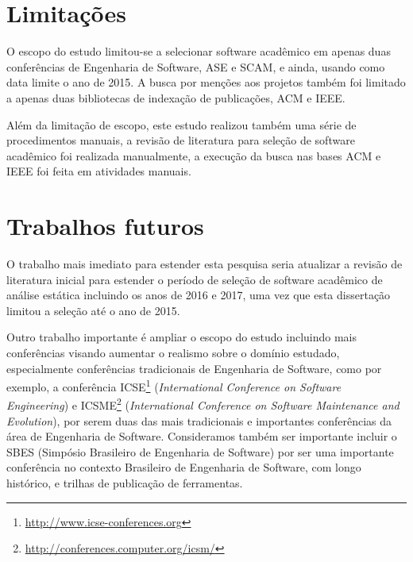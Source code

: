 
\section{Limitações}


O escopo do estudo limitou-se a selecionar software acadêmico em apenas
duas conferências de
Engenharia de Software, ASE e SCAM, e ainda, usando como data limite o ano de
2015. A busca por menções aos projetos também foi limitado a apenas duas
bibliotecas de indexação de publicações, ACM e IEEE.


Além da limitação de escopo, este estudo realizou também uma série de
procedimentos manuais, a revisão de literatura para seleção de software
acadêmico foi realizada manualmente, a execução da busca nas bases ACM e IEEE
foi feita em atividades manuais.


\section{Trabalhos futuros}


O trabalho mais imediato para estender esta pesquisa seria atualizar a revisão
de literatura inicial para estender o período de seleção de software acadêmico
de análise estática incluindo os anos de 2016 e 2017, uma vez que esta
dissertação limitou a seleção até o ano de 2015.

Outro trabalho importante é ampliar o escopo do estudo incluindo mais
conferências visando aumentar o realismo sobre o domínio estudado,
especialmente conferências tradicionais de Engenharia de Software, como por
exemplo, a conferência ICSE\footnote{\url{http://www.icse-conferences.org}}
({\it International Conference on Software Engineering}) e
ICSME\footnote{\url{http://conferences.computer.org/icsm/}} ({\it International
Conference on Software Maintenance and Evolution}), por serem duas das mais
tradicionais e importantes conferências da área de Engenharia de Software.
Consideramos também ser importante incluir o SBES (Simpósio Brasileiro de
Engenharia de Software) por ser uma importante conferência no contexto
Brasileiro de Engenharia de Software, com longo histórico, e trilhas de
publicação de ferramentas.

